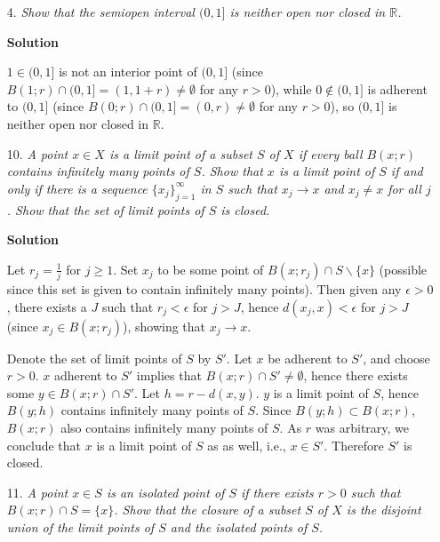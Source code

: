 \documentclass{article}
\begin{document}
\begin{enumerate}
\begin{itemize}

\item[4.] {\em Show that the semiopen interval \((0,1]\) is neither open nor closed in \(\mathbb{R}\).}

{\bf Solution}

\(1 \in (0,1]\) is not an interior point of \((0,1]\) (since \(B(1;r) \cap (0,1] = (1,1+r) \neq \emptyset\) for any \(r > 0\)), while \(0 \notin (0,1]\) is adherent to \((0,1]\) (since \(B(0;r) \cap (0,1] = (0,r) \neq \emptyset\) for any \(r > 0\)), so \((0,1]\) is neither open nor closed in \(\mathbb{R}\).



\item[10.] {\em A point \(x \in X\) is a {\em limit point} of a subset \(S\) of \(X\) if every ball \(B(x;r)\) contains infinitely many points of \(S\).  Show that \(x\) is a limit point of \(S\) if and only if there is a sequence \(\{x_j\}_{j = 1}^{\infty}\) in \(S\) such that \(x_j \to x\) and \(x_j \neq x\) for all \(j\).  Show that the set of limit points of \(S\) is closed.}

{\bf Solution}

Let \(r_j = \frac{1}{j}\) for \(j \geq 1\).  Set \(x_j\) to be some point of \(B(x;r_j) \cap S \backslash \{x\}\) (possible since this set is given to contain infinitely many points).  Then given any \(\epsilon > 0\), there exists a \(J\) such that \(r_j < \epsilon\) for \(j > J\), hence \(d(x_j, x) < \epsilon\) for \(j > J\) (since \(x_j \in B(x;r_j)\)), showing that \(x_j \to x\).

Denote the set of limit points of \(S\) by \(S'\).  Let \(x\) be adherent to \(S'\), and choose \(r > 0\).  \(x\) adherent to \(S'\) implies that \(B(x;r) \cap S' \neq \emptyset\), hence there exists some \(y \in B(x;r) \cap S'\).  Let \(h = r - d(x, y)\).  \(y\) is a limit point of \(S\), hence \(B(y;h)\) contains infinitely many points of \(S\).  Since \(B(y;h) \subset B(x;r)\), \(B(x;r)\) also contains infinitely many points of \(S\).  As \(r\) was arbitrary, we conclude that \(x\) is a limit point of \(S\) as as well, i.e., \(x \in S'\).  Therefore \(S'\) is closed.



\item[11.] {\em A point \(x \in S\) is an {\em isolated point} of \(S\) if there exists \(r > 0\) such that \(B(x;r) \cap S = \{x\}\).  Show that the closure of a subset \(S\) of \(X\) is the disjoint union of the limit points of \(S\) and the isolated points of \(S\).}


\end{itemize}
\end{enumerate}
\end{document}
